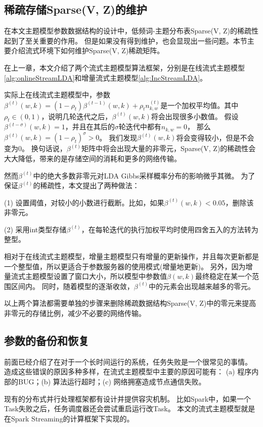 \subsection{稀疏存储Sparse(V, Z)的维护}
在本文主题模型参数数据结构的设计中，低频词-主题分布表Sparse(V, Z)的稀疏性起到了至关重要的作用。
但是如果没有得到维护，也会显现出一些问题。本节主要介绍流式环境下如何维护Sparse(V, Z)稀疏矩阵。

在上一章，本文介绍了两个流式主题模型算法框架，分别是在线流式主题模型\ref{alg:onlineStreamLDA}和增量流式主题模型\ref{alg:IncStreamLDA}。

实际上在线流式主题模型中，参数$\beta^{(t)}(w, k) = (1 - \rho_t) \beta^{(t-1)}(w, k) + \rho_t n_{k, w}^{(t)}$是一个加权平均值。其中$\rho_t \in (0, 1)$，说明几轮迭代之后，$\beta^{(t)}(w, k)$将会出现很多小数值。
假设$\beta^{(t-\sigma)}(w, k) = 1$，并且在其后的$\sigma$轮迭代中都有$n_{k,w} = 0$，
那么$\beta^{(t)}(w, k) = (1 - \rho_t)^{\sigma} > 0 $。
我们发现$\beta^{(t)}(w, k)$将会变得较小，但是不会变为0。
换句话说，$\beta^{(t)}$矩阵中将会出现大量的非零元，Sparse(V, Z)的稀疏性会大大降低，带来的是存储空间的消耗和更多的网络传输。

然而$\beta^{(t)}$中的绝大多数非零元对LDA Gibbs采样概率分布的影响微乎其微。
为了保证$\beta^{(t)}$的稀疏性，本文提出了两种做法：

(1) 设置阈值，对较小的小数进行截断。比如，如果$\beta^{(t)}(w, k) < 0.05$，删除该非零元。

(2) 采用int类型存储$\beta^{(t)}$，在每轮迭代的执行加权平均时使用四舍五入的方法转为整型。

相对于在线流式主题模型，增量主题模型只有增量的更新操作，并且每次更新都是一个整型值，所以更适合于参数服务器的使用模式(增量地更新)。
另外，因为增量流式主题模型设置了窗口大小，所以模型中参数值$\beta(w, k)$最终稳定在某一个范围区间内。
同时，随着模型的逐渐收敛，$\beta^{(t)}$中的元素会出现越来越多的零元。

以上两个算法都需要单独的步骤来删除稀疏数据结构Sparse(V, Z)中的零元来提高非零元的存储比例，减少不必要的网络传输。

\subsection{参数的备份和恢复}
前面已经介绍了在对于一个长时间运行的系统，任务失败是一个很常见的事情。
造成这些错误的原因多种多样，在流式主题模型中主要的原因可能有：
(a) 程序内部的BUG；(b) 算法运行超时；(c) 网络拥塞造成节点通信失败。

现有的分布式并行处理框架都有设计并提供容灾机制。
比如Spark中，如果一个Task失败之后，任务调度器还会尝试重启运行改Task。
本文的流式主题模型就是在Spark Streaming的计算框架下实现的。

